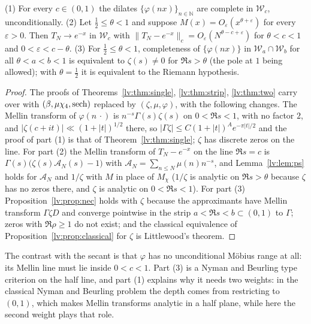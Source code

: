 \begin{theorem}\label{lv:thm:zeta}
(1) For every $c\in(0,1)$ the dilates $\{\varphi(nx)\}_{n\in\mathbb N}$ are complete in $\mathcal W_c$, unconditionally. (2) Let $\frac12\le\theta<1$ and suppose $M(x)=O_\varepsilon(x^{\theta+\varepsilon})$ for every $\varepsilon>0$. Then $T_N\to e^{-x}$ in $\mathcal W_c$ with $\|T_N-e^{-x}\|_c=O_\varepsilon(N^{\theta-c+\varepsilon})$ for $\theta<c<1$ and $0<\varepsilon<c-\theta$. (3) For $\frac12\le\theta<1$, completeness of $\{\varphi(nx)\}$ in $\mathcal W_a\cap\mathcal W_b$ for all $\theta<a<b<1$ is equivalent to $\zeta(s)\ne0$ for $\Re s>\theta$ (the pole at $1$ being allowed); with $\theta=\frac12$ it is equivalent to the Riemann hypothesis.
\end{theorem}

\begin{proof}
The proofs of Theorems~\ref{lv:thm:single}, \ref{lv:thm:strip}, \ref{lv:thm:two} carry over with $(\beta,\mu\chi_4,\operatorname{sech})$ replaced by $(\zeta,\mu,\varphi)$, with the following changes. The Mellin transform of $\varphi(n\,\cdot)$ is $n^{-s}\Gamma(s)\zeta(s)$ on $0<\Re s<1$, with no factor $2$, and $|\zeta(c+it)|\ll(1+|t|)^{1/2}$ there, so $|\Gamma\zeta|\le C(1+|t|)^Ae^{-\pi|t|/2}$ and the proof of part (1) is that of Theorem~\ref{lv:thm:single}; $\zeta$ has discrete zeros on the line. For part (2) the Mellin transform of $T_N-e^{-x}$ on the line $\Re s=c$ is $\Gamma(s)\bigl(\zeta(s)\mathcal A_N(s)-1\bigr)$ with $\mathcal A_N=\sum_{n\le N}\mu(n)n^{-s}$, and Lemma~\ref{lv:lem:ps} holds for $\mathcal A_N$ and $1/\zeta$ with $M$ in place of $M_\chi$ ($1/\zeta$ is analytic on $\Re s>\theta$ because $\zeta$ has no zeros there, and $\zeta$ is analytic on $0<\Re s<1$). For part (3) Proposition~\ref{lv:prop:nec} holds with $\zeta$ because the approximants have Mellin transform $\Gamma\zeta D$ and converge pointwise in the strip $a<\Re s<b\subset(0,1)$ to $\Gamma$; zeros with $\Re\rho\ge1$ do not exist; and the classical equivalence of Proposition~\ref{lv:prop:classical} for $\zeta$ is Littlewood's theorem.
\end{proof}

The contrast with the secant is that $\varphi$ has no unconditional M\"obius range at all: its Mellin line must lie inside $0<c<1$. Part (3) is a Nyman and Beurling type criterion on the half line, and part (1) explains why it needs two weights: in the classical Nyman and Beurling problem the depth comes from restricting to $(0,1)$, which makes Mellin transforms analytic in a half plane, while here the second weight plays that role.

